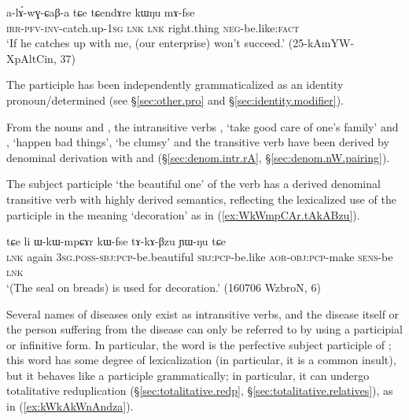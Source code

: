 \begin{exe}
\ex \label{ex:kWNu.mAfse}
 \gll  a-lɤ́-wɣ-ɕaβ-a tɕe tɕendɤre kɯŋu mɤ-fse \\
 \textsc{irr}-\textsc{pfv}-\textsc{inv}-catch.up-\textsc{1sg} \textsc{lnk} \textsc{lnk} right.thing \textsc{neg}-be.like:\textsc{fact} \\ 
\glt `If he catches up with me, (our enterprise) won't succeed.' (25-kAmYW-XpAltCin, 37)
\end{exe}

The participle  has been independently grammaticalized as an identity pronoun/determined  (see §\ref{sec:other.pro} and §\ref{sec:identity.modifier}).

From the nouns   and  , the intransitive verbs , `take good care of one's family' and , `happen bad things', `be clumsy' and the transitive verb  have been derived by denominal derivation with  and  (§\ref{sec:denom.intr.rA}, §\ref{sec:denom.nW.pairing}).

The subject participle  `the beautiful one' of the verb  has a derived denominal transitive verb  with highly derived semantics, reflecting the lexicalized use of the participle in the meaning `decoration' as in (\ref{ex:WkWmpCAr.tAkABzu}).

 \begin{exe}
\ex \label{ex:WkWmpCAr.tAkABzu}
 \gll tɕe li ɯ-kɯ-mpɕɤr kɯ-fse tɤ-kɤ-βzu ɲɯ-ŋu tɕe    \\
\textsc{lnk} again \textsc{3sg}.\textsc{poss}-\textsc{sbj}:\textsc{pcp}-be.beautiful \textsc{sbj}:\textsc{pcp}-be.like \textsc{aor}-\textsc{obj}:\textsc{pcp}-make \textsc{sens}-be \textsc{lnk} \\
 \glt `(The seal on breads) is used for decoration.' (160706 WzbroN, 6)
\end{exe}

Several names of diseases only exist as intransitive verbs, and the disease itself or the person suffering from the disease can only be referred to by using a participial or infinitive form. In particular, the word  is the perfective subject participle of ; this word has some degree of lexicalization (in particular, it is a common insult), but it behaves like a participle grammatically; in particular, it can undergo totalitative reduplication (§\ref{sec:totalitative.redp}, §\ref{sec:totalitative.relatives}), as in (\ref{ex:kWkAkWnAndza}).

